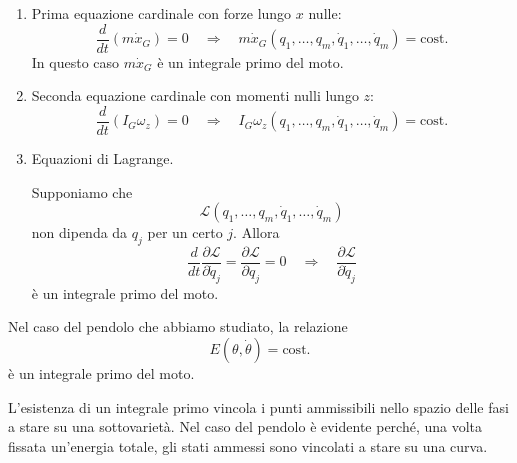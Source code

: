 \begin{example}{}
\begin{enumerate}[label=\roman*)]
\item Prima equazione cardinale con forze lungo $x$ nulle:
\[
\frac{d}{dt}\left(m\dot{x}_G\right)=0
\quad \Longrightarrow \quad
m\dot{x}_G(q_1,\ldots,q_m,\dot{q}_1,\ldots,\dot{q}_m)
=
\mathrm{cost.}
\]
In questo caso $m\dot{x}_G$ è un integrale primo del moto.

\item Seconda equazione cardinale con momenti nulli lungo $z$:
\[
\frac{d}{dt}\left(I_G\omega_z\right)=0
\quad \Longrightarrow \quad
I_G\omega_z(q_1,\ldots,q_m,\dot{q}_1,\ldots,\dot{q}_m)
=
\mathrm{cost.}
\]

\item Equazioni di Lagrange.

Supponiamo che
\[
\mathcal{L}(q_1,\ldots,q_m,\dot{q}_1,\ldots,\dot{q}_m)
\]
non dipenda da $q_j$ per un certo $j$. Allora
\[
\frac{d}{dt}
\frac{\partial \mathcal{L}}{\partial \dot{q}_j}
=
\frac{\partial \mathcal{L}}{\partial q_j}
=
0
\quad \Longrightarrow \quad
\frac{\partial \mathcal{L}}{\partial \dot{q}_j}
\]
è un integrale primo del moto.
\end{enumerate}
\end{example}

\begin{example}{}
Nel caso del pendolo che abbiamo studiato, la relazione
\[
E(\theta,\dot{\theta})=\mathrm{cost.}
\]
è un integrale primo del moto.

L'esistenza di un integrale primo vincola i punti ammissibili nello spazio delle fasi a stare su una sottovarietà. Nel caso del pendolo è evidente perché, una volta fissata un'energia totale, gli stati ammessi sono vincolati a stare su una curva.
\end{example}

